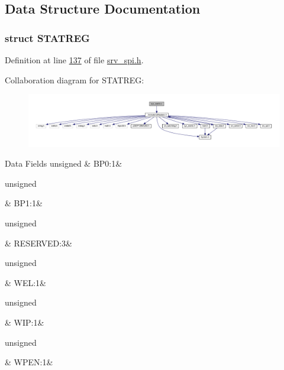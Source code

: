 \subsection{Data Structure Documentation}
\label{d8/d7d/a00789}
\hypertarget{a00013_d8/d7d/a00789}{}
\subsubsection{struct S\+T\+A\+T\+R\+E\+G}


Definition at line \hyperlink{a00013_source_l00137}{137} of file \hyperlink{a00013_source}{srv\+\_\+spi.\+h}.



Collaboration diagram for S\+T\+A\+T\+R\+E\+G\+:\nopagebreak
\begin{figure}[H]
\begin{center}
\leavevmode
\includegraphics[width=350pt]{d6/d15/a01697}
\end{center}
\end{figure}
\begin{DoxyFields}{Data Fields}
\hypertarget{a00013_ab3d9157e202ff59406f5ead250a755c4}{unsigned}\label{a00013_ab3d9157e202ff59406f5ead250a755c4}
&
B\+P0\+:1&
\\
\hline

\hypertarget{a00013_a15cb6e78e0c7f48b64595c2378ea646c}{unsigned}\label{a00013_a15cb6e78e0c7f48b64595c2378ea646c}
&
B\+P1\+:1&
\\
\hline

\hypertarget{a00013_a4ef10d89ed21189c926e11227bab7c3d}{unsigned}\label{a00013_a4ef10d89ed21189c926e11227bab7c3d}
&
R\+E\+S\+E\+R\+V\+E\+D\+:3&
\\
\hline

\hypertarget{a00013_a30c6e84d13356eef9e4d20600c3b5433}{unsigned}\label{a00013_a30c6e84d13356eef9e4d20600c3b5433}
&
W\+E\+L\+:1&
\\
\hline

\hypertarget{a00013_ab9c53087b26832e54862ba3c7b41a05d}{unsigned}\label{a00013_ab9c53087b26832e54862ba3c7b41a05d}
&
W\+I\+P\+:1&
\\
\hline

\hypertarget{a00013_a55afe6de18b91f01a2d525bdf47b8554}{unsigned}\label{a00013_a55afe6de18b91f01a2d525bdf47b8554}
&
W\+P\+E\+N\+:1&
\\
\hline

\end{DoxyFields}
\label{db/df8/a00076}
\hypertarget{a00013_db/df8/a00076}{}
